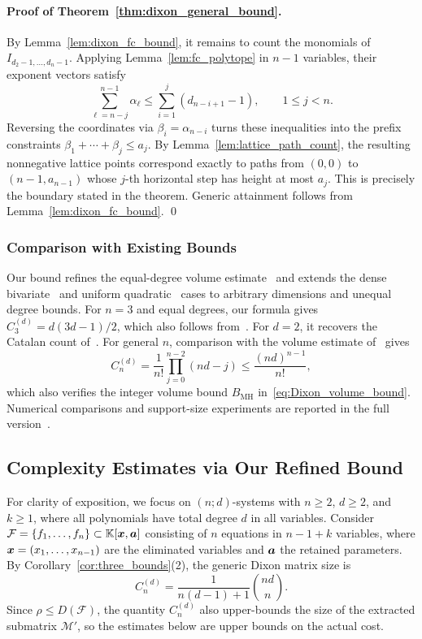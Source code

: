 \paragraph{Proof of Theorem~\ref{thm:dixon_general_bound}.}
By Lemma~\ref{lem:dixon_fc_bound}, it remains to count the
monomials of $I_{d_2-1,\ldots,d_n-1}$.
Applying Lemma~\ref{lem:fc_polytope} in $n-1$ variables,
their exponent vectors satisfy
\[
\sum_{\ell=n-j}^{n-1}\alpha_\ell
\le \sum_{i=1}^{j}(d_{n-i+1}-1),
\qquad 1\le j<n.
\]
Reversing the coordinates via $\beta_i=\alpha_{n-i}$ turns
these inequalities into the prefix constraints
$\beta_1+\cdots+\beta_j\le a_j$.
By Lemma~\ref{lem:lattice_path_count}, the resulting
nonnegative lattice points correspond exactly to paths from
$(0,0)$ to $(n-1,a_{n-1})$ whose $j$-th horizontal step has
height at most $a_j$. This is precisely the boundary stated
in the theorem. Generic attainment follows from
Lemma~\ref{lem:dixon_fc_bound}.
\qed

\subsubsection{Comparison with Existing Bounds}

Our bound refines the equal-degree volume estimate~\cite{DBLP:conf/stoc/KapurS96} and extends the dense bivariate~\cite{ChtcherbaKapur2004Bivariate} and uniform quadratic~\cite{cryptoeprint:2005/312} cases to arbitrary dimensions and unequal degree bounds. For $n=3$ and equal degrees, our formula gives $C_3^{(d)}=d(3d-1)/2$, which also follows from~\cite[Theorem~4.4]{ChtcherbaKapur2004Bivariate}. For $d=2$, it recovers the Catalan count of~\cite{cryptoeprint:2005/312}. For general $n$, comparison with the volume estimate of~\cite[Theorem~4.3]{DBLP:conf/stoc/KapurS96} gives
\[
C_n^{(d)}=\frac1{n!}\prod_{j=0}^{n-2}(nd-j)
\le\frac{(nd)^{n-1}}{n!},
\]
which also verifies the integer volume bound $B_{\mathrm{MH}}$ in~\eqref{eq:Dixon_volume_bound}. Numerical comparisons and support-size experiments are reported in the full version~\cite{cryptoeprint:2026/1969}.

\subsection{Complexity Estimates via Our Refined Bound}\label{Section:Estimate}

For clarity of exposition, we focus on $(n;d)$-systems with $n\ge2$, $d\ge2$, and $k\ge1$, where all polynomials have total degree $d$ in all variables. Consider $\mathcal{F} = \{f_1, \ldots, f_n\} \subset \mathbb{K}[{\boldsymbol{x}},{\boldsymbol{a}}]$ consisting of $n$ equations in $n-1+k$ variables, where ${\boldsymbol{x}}=(x_1,\ldots,x_{n-1})$ are the eliminated variables and ${\boldsymbol{a}}$ the retained parameters. By Corollary~\ref{cor:three_bounds}(2), the generic Dixon matrix size is
\[
C_n^{(d)} = \frac{1}{n(d-1)+1}\binom{nd}{n}.
\]
Since $\rho\le D(\mathcal{F})$, the quantity $C_n^{(d)}$ also upper-bounds the size of the extracted submatrix $\mathcal{M}'$, so the estimates below are upper bounds on the actual cost. 

